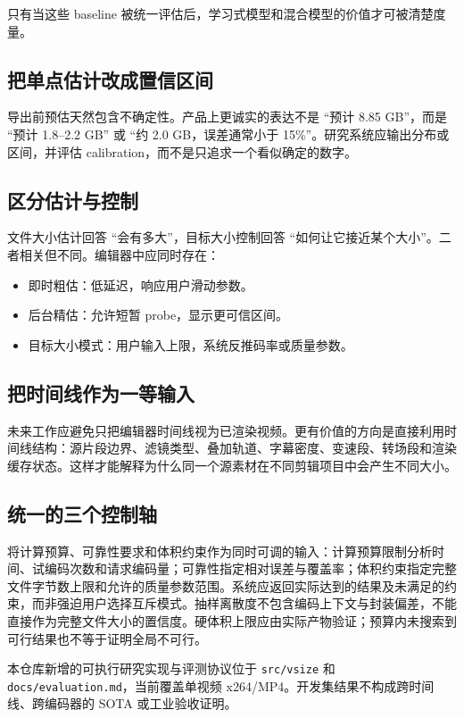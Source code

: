\documentclass[UTF8,a4paper,11pt]{ctexart}
\begin{document}
只有当这些 baseline 被统一评估后，学习式模型和混合模型的价值才可被清楚度量。

\subsection{把单点估计改成置信区间}

导出前预估天然包含不确定性。产品上更诚实的表达不是 ``预计 8.85 GB''，而是 ``预计 1.8--2.2 GB'' 或 ``约 2.0 GB，误差通常小于 15\%''。研究系统应输出分布或区间，并评估 calibration，而不是只追求一个看似确定的数字。

\subsection{区分估计与控制}

文件大小估计回答 ``会有多大''，目标大小控制回答 ``如何让它接近某个大小''。二者相关但不同。编辑器中应同时存在：

\begin{itemize}
  \item 即时粗估：低延迟，响应用户滑动参数。
  \item 后台精估：允许短暂 probe，显示更可信区间。
  \item 目标大小模式：用户输入上限，系统反推码率或质量参数。
\end{itemize}

\subsection{把时间线作为一等输入}

未来工作应避免只把编辑器时间线视为已渲染视频。更有价值的方向是直接利用时间线结构：源片段边界、滤镜类型、叠加轨道、字幕密度、变速段、转场段和渲染缓存状态。这样才能解释为什么同一个源素材在不同剪辑项目中会产生不同大小。

\subsection{统一的三个控制轴}

将计算预算、可靠性要求和体积约束作为同时可调的输入：计算预算限制分析时间、试编码次数和请求编码量；可靠性指定相对误差与覆盖率；体积约束指定完整文件字节数上限和允许的质量参数范围。系统应返回实际达到的结果及未满足的约束，而非强迫用户选择互斥模式。抽样离散度不包含编码上下文与封装偏差，不能直接作为完整文件大小的置信度。硬体积上限应由实际产物验证；预算内未搜索到可行结果也不等于证明全局不可行。

本仓库新增的可执行研究实现与评测协议位于 \texttt{src/vsize} 和 \texttt{docs/evaluation.md}，当前覆盖单视频 x264/MP4。开发集结果不构成跨时间线、跨编码器的 SOTA 或工业验收证明。
\end{document}
